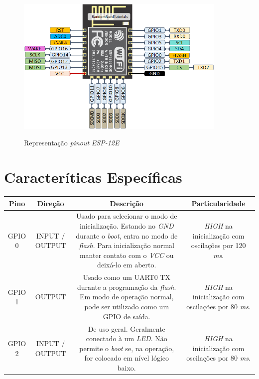 \begin{anexosenv}
\begin{figure}[H]
	\centering
	\caption{Representação \textit{pinout} \textit{ESP-12E}}
	\includegraphics[width=0.9\textwidth]{figuras/ESP-12E_pinout.png}
	\label{fig:esp12e_pinout}
\end{figure} 

\section {Caracteríticas Específicas}




\begin{table}[]
	\centering
	\small
	\begin{tabular}{c|c|c|c}
		\hline
		\textbf{Pino} & \textbf{Direção} & \textbf{Descrição} & \textbf{Particularidade} \\ \hline
		
		GPIO 0 & INPUT / OUTPUT & \multicolumn{1}{m{6cm}|}{Usado para selecionar o modo de inicialização. Estando no \textit{GND} durante o \textit{boot}, entra no modo de \textit{flash}. Para inicialização normal manter contato com o \textit{VCC} ou deixá-lo em aberto.} & \multicolumn{1}{m{4cm}}{\textit{HIGH} na inicialização com oscilações por 120 \textit{ms}.} \\ \hline
		
		GPIO 1 & OUTPUT & \multicolumn{1}{m{6cm}|}{Usado como um UART0 TX durante a programação da \textit{flash}. Em modo de operação normal, pode ser utilizado como um GPIO de saída.} &  \multicolumn{1}{m{4cm}}{\textit{HIGH} na inicialização com oscilações por 80 \textit{ms}.} \\ \hline
		
		GPIO 2 & INPUT / OUTPUT & \multicolumn{1}{m{6cm}|}{De uso geral. Geralmente conectado à um \textit{LED}. Não permite o \textit{boot} se, na operação, for colocado em nível lógico baixo.} & \multicolumn{1}{m{4cm}}{\textit{HIGH} na inicialização com oscilações por 80 \textit{ms}.}\\ \hline
		

\end{tabular}
\end{table}
\end{anexosenv}
